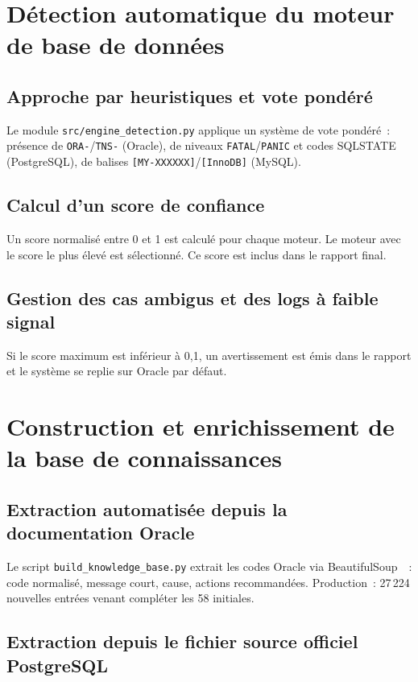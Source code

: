 \documentclass[12pt,a4paper]{report}
\begin{document}
\section{D\'etection automatique du moteur de base de donn\'ees}

\subsection{Approche par heuristiques et vote pond\'er\'e}

Le module \texttt{src/engine\_detection.py} applique un syst\`eme de vote
pond\'er\'e~: pr\'esence de \texttt{ORA-}/\texttt{TNS-} (Oracle), de niveaux
\texttt{FATAL}/\texttt{PANIC} et codes SQLSTATE (PostgreSQL), de balises
\texttt{[MY-XXXXXX]}/\texttt{[InnoDB]} (MySQL).

\subsection{Calcul d'un score de confiance}

Un score normalis\'e entre 0 et 1 est calcul\'e pour chaque moteur. Le moteur avec
le score le plus \'elev\'e est s\'electionn\'e. Ce score est inclus dans le rapport final.

\subsection{Gestion des cas ambigus et des logs \`a faible signal}

Si le score maximum est inf\'erieur \`a 0,1, un avertissement est \'emis dans le
rapport et le syst\`eme se replie sur Oracle par d\'efaut.

\section{Construction et enrichissement de la base de connaissances}

\subsection{Extraction automatis\'ee depuis la documentation Oracle}

Le script \texttt{build\_knowledge\_base.py} extrait les codes Oracle via
BeautifulSoup~\cite{bs4}~: code normalis\'e, message court, cause, actions recommand\'ees.
Production~: 27\,224 nouvelles entr\'ees venant compl\'eter les 58 initiales.

\subsection{Extraction depuis le fichier source officiel PostgreSQL}
\end{document}
